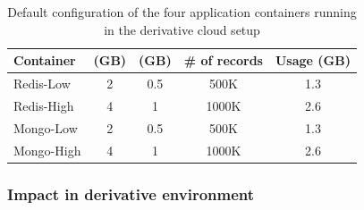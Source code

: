       \begin{table}[t]
	  \begin{center}	   
	    \begin{tabular}{| l | c | c | c | c |}
	      \hline
	      Container & \hl{} (GB) & \sol{} (GB) & \# of records & Usage (GB)  \\ 
	      \hline
	      \hline
	      Redis-Low & 2 & 0.5 & 500K & 1.3 \\  
	      \hline
	      Redis-High & 4 & 1 & 1000K & 2.6 \\  
	      \hline
	      Mongo-Low & 2 & 0.5 & 500K & 1.3 \\
	      \hline
	      Mongo-High & 4 & 1 & 1000K & 2.6 \\
	      \hline
	    \end{tabular}	  
	  \end{center}
	  \caption{Default configuration of the four application containers running in the derivative cloud setup}
	  \label{tbl:table_default_config}	  
	\end{table}
    
     \subsubsection{Impact in derivative environment}
	
